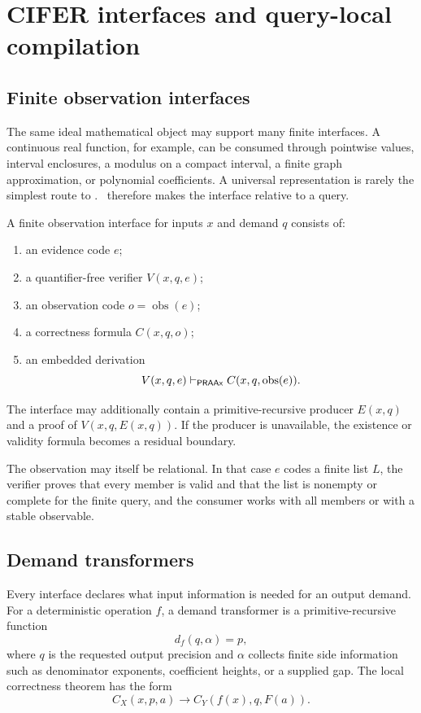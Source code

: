 \section{CIFER interfaces and query-local compilation}

\subsection{Finite observation interfaces}

The same ideal mathematical object may support many finite interfaces.  A continuous real function, for example, can be consumed through pointwise values, interval enclosures, a modulus on a compact interval, a finite graph approximation, or polynomial coefficients.  A universal representation is rarely the simplest route to \iPRA.  \CIFER\ therefore makes the interface relative to a query.

\begin{definition}
A finite observation interface for inputs \(x\) and demand \(q\) consists of:
\begin{enumerate}
\item an evidence code \(e\);
\item a quantifier-free verifier \(V(x,q,e)\);
\item an observation code \(o=\operatorname{obs}(e)\);
\item a correctness formula \(C(x,q,o)\);
\item an embedded derivation
\[
 V(x,q,e)\vdash_{\mathsf{PRAAx}} C(x,q,\operatorname{obs}(e)).
\]
\end{enumerate}
The interface may additionally contain a primitive-recursive producer \(E(x,q)\) and a proof of \(V(x,q,E(x,q))\).  If the producer is unavailable, the existence or validity formula becomes a residual boundary.
\end{definition}

The observation may itself be relational.  In that case \(e\) codes a finite list \(L\), the verifier proves that every member is valid and that the list is nonempty or complete for the finite query, and the consumer works with all members or with a stable observable.

\subsection{Demand transformers}

Every interface declares what input information is needed for an output demand.  For a deterministic operation \(f\), a demand transformer is a primitive-recursive function
\[
 d_f(q,\alpha)=p,
\]
where \(q\) is the requested output precision and \(\alpha\) collects finite side information such as denominator exponents, coefficient heights, or a supplied gap.  The local correctness theorem has the form
\[
  C_X(x,p,a)\to C_Y(f(x),q,F(a)).
\]

